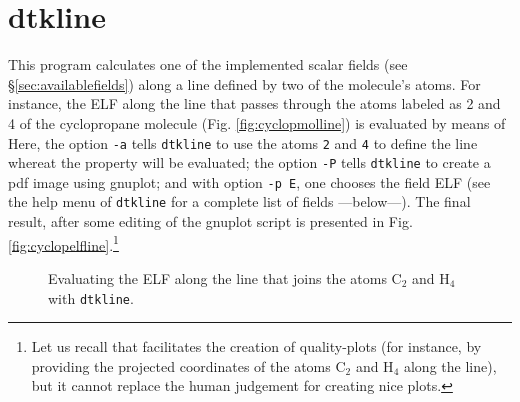 \section{dtkline}
This program calculates one of the implemented scalar fields (see \S\ref{sec:availablefields}) along a line defined by two of the molecule's atoms. For instance, the ELF along the line that passes through the atoms labeled as 2 and 4 of the cyclopropane molecule (Fig. \ref{fig:cyclopmolline}) is evaluated by means of\\
Here, the option \texttt{-a} tells \texttt{dtkline} to use the atoms \texttt{2} and \texttt{4} to define the line whereat the property will be evaluated; the option \texttt{-P} tells \texttt{dtkline} to create a pdf image using gnuplot; and with option \texttt{-p E}, one chooses the field ELF (see the help menu of \texttt{dtkline} for a complete list of fields ---below---). The final result, after some editing of the gnuplot script is presented in Fig. \ref{fig:cyclopelfline}.\footnote{Let us recall that \DTK{} facilitates the creation of quality-plots (for instance, by providing the projected coordinates of the atoms C$_2$ and H$_4$ along the line), but it cannot replace the human judgement for creating nice plots.}
\begin{figure}[hb!]
\centering
{}\quad%
\caption{Evaluating the ELF along the line that joins the atoms C$_2$ and H$_4$ with \texttt{dtkline}.}\label{fig:dtklineuseex}
\end{figure}

